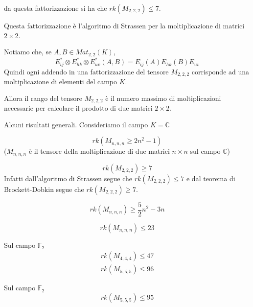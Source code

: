 \documentclass[../main.tex]{subfiles}
\begin{document}
da questa fattorizzazione si ha che $rk(M_{2,2,2}) \leq 7$.

Questa fattorizzazione è l'algoritmo di Strassen per la moltiplicazione di matrici $2 \times 2$.

Notiamo che, se $A,B \in Mat_{2,2}(K)$,
\begin{equation*}
    E_{ij}^* \otimes E_{hk}^* \otimes E_{uv}^* (A,B) = E_{ij}(A)E_{hk}(B)E_{uv}
\end{equation*}
Quindi ogni addendo in una fattorizzazione del tensore $M_{2,2,2}$ corrisponde ad una moltiplicazione di elementi del campo $K$.

Allora il rango del tensore $M_{2,2,2}$ è il numero massimo di moltiplicazioni necessarie per calcolare il prodotto di due matrici $2 \times 2$.

\newpage

Alcuni risultati generali. Consideriamo il campo $K = \mathbb{C}$
\begin{theorem}
    \begin{equation*}
        rk(M_{n,n,n} \geq 2n^2 -1)
    \end{equation*}
    ($M_{n,n,n}$ è il tensore della moltiplicazione di due matrici $n \times n$ sul campo $\mathbb{C}$)
\end{theorem}
\begin{corollary}
    \begin{equation*}
        rk(M_{2,2,2}) \geq 7
    \end{equation*}
    Infatti dall'algoritmo di Strassen segue che $rk(M_{2,2,2}) \leq 7$ e dal teorema di Brockett-Dobkin segue che $rk(M_{2,2,2}) \geq 7$.
\end{corollary}

\begin{theorem}[di Bläser (1999)]
    \begin{equation*}
        rk(M_{n,n,n}) \geq \frac{5}{2}n^2 - 3n
    \end{equation*}
\end{theorem}

\begin{theorem}[di Laderman (1976)]
    \begin{equation*}
        rk(M_{n,n,n}) \leq 23
    \end{equation*}
\end{theorem}

\begin{theorem}[Deepmind (2022)]
    Sul campo $\mathbb{F}_2$
    \begin{gather*}
        rk(M_{4,4,4}) \leq 47\\
        rk(M_{5,5,5}) \leq 96
    \end{gather*}

\end{theorem}

\begin{theorem}
    Sul campo $\mathbb{F}_2$
    \begin{equation*}
        rk(M_{5,5,5}) \leq 95
    \end{equation*}
\end{theorem}
\end{document}
